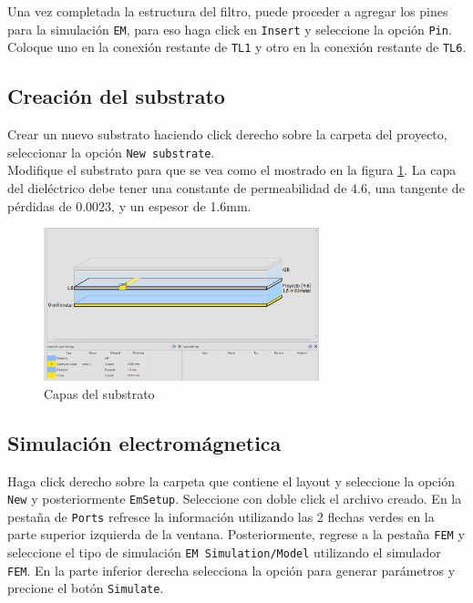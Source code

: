Una vez completada la estructura del filtro, puede proceder a agregar los pines para la simulación \texttt{EM}, para eso haga click en \texttt{Insert} y seleccione la opción \texttt{Pin}. Coloque uno en la conexión restante de \texttt{TL1} y otro en la conexión restante de \texttt{TL6}.

\subsection{Creación del substrato}

Crear un nuevo substrato haciendo click derecho sobre la carpeta del proyecto, seleccionar la opción \texttt{New substrate}. \\

Modifique el substrato para que se vea como el mostrado en la figura \ref{fig:metologia_substrato}. La capa del dieléctrico debe tener una constante de permeabilidad de 4.6, una tangente de pérdidas de $0.0023$, y un espesor de 1.6mm.
\begin{figure}[h!]
    \centering
    \includegraphics[width=8cm]{figures/metodologia/metologia4.png}
    \caption{Capas del substrato}
    \label{fig:metologia_substrato}
\end{figure}

\subsection{Simulación electromágnetica}

Haga click derecho sobre la carpeta que contiene el layout y seleccione la opción \texttt{New} y posteriormente \texttt{EmSetup}. Seleccione con doble click el archivo creado.
En la pestaña de \texttt{Ports} refresce la información utilizando las 2 flechas verdes en la parte superior izquierda de la ventana. Posteriormente, regrese a la pestaña \texttt{FEM} y seleccione el tipo de simulación \texttt{EM Simulation/Model} utilizando el simulador \texttt{FEM}. En la parte inferior derecha selecciona la opción para generar parámetros y precione el botón \texttt{Simulate}.
